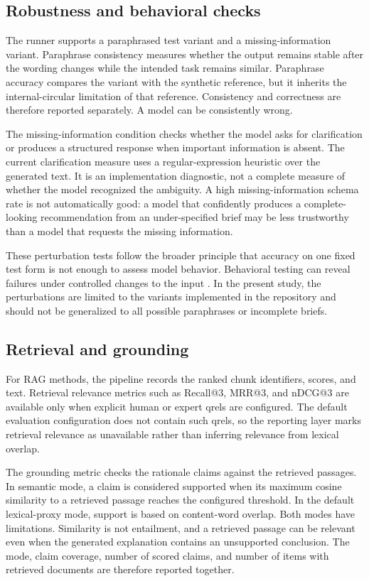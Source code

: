 \subsection{Robustness and behavioral checks}

The runner supports a paraphrased test variant and a missing-information variant. Paraphrase consistency measures whether the output remains stable after the wording changes while the intended task remains similar. Paraphrase accuracy compares the variant with the synthetic reference, but it inherits the internal-circular limitation of that reference. Consistency and correctness are therefore reported separately. A model can be consistently wrong.

The missing-information condition checks whether the model asks for clarification or produces a structured response when important information is absent. The current clarification measure uses a regular-expression heuristic over the generated text. It is an implementation diagnostic, not a complete measure of whether the model recognized the ambiguity. A high missing-information schema rate is not automatically good: a model that confidently produces a complete-looking recommendation from an under-specified brief may be less trustworthy than a model that requests the missing information.

These perturbation tests follow the broader principle that accuracy on one fixed test form is not enough to assess model behavior. Behavioral testing can reveal failures under controlled changes to the input \cite{ribeiro2020checklist}. In the present study, the perturbations are limited to the variants implemented in the repository and should not be generalized to all possible paraphrases or incomplete briefs.

\subsection{Retrieval and grounding}

For RAG methods, the pipeline records the ranked chunk identifiers, scores, and text. Retrieval relevance metrics such as Recall@3, MRR@3, and nDCG@3 are available only when explicit human or expert qrels are configured. The default evaluation configuration does not contain such qrels, so the reporting layer marks retrieval relevance as unavailable rather than inferring relevance from lexical overlap.

The grounding metric checks the rationale claims against the retrieved passages. In semantic mode, a claim is considered supported when its maximum cosine similarity to a retrieved passage reaches the configured threshold. In the default lexical-proxy mode, support is based on content-word overlap. Both modes have limitations. Similarity is not entailment, and a retrieved passage can be relevant even when the generated explanation contains an unsupported conclusion. The mode, claim coverage, number of scored claims, and number of items with retrieved documents are therefore reported together.


